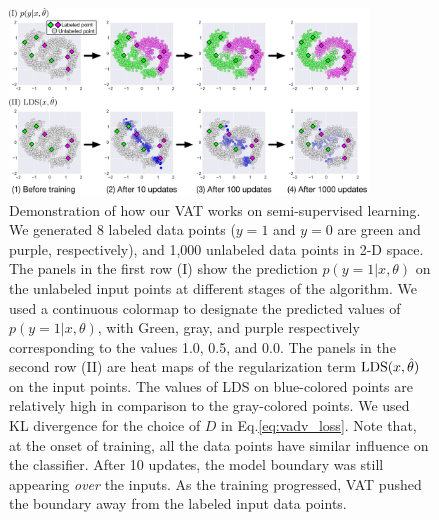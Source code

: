 \documentclass[10pt,journal,compsoc]{IEEEtran}
\begin{document}
\begin{figure}[ht]
	\centering
	\includegraphics[width=0.85\textwidth]{syn_semisup.png}
	\caption{\label{fig:syn_cont} Demonstration of how our VAT works on semi-supervised learning. We generated 8 labeled data points ($y=1$ and $y=0$ are green and purple, respectively), and 1,000 unlabeled data points in 2-D space. 
    The panels in the first row (I) show the prediction $p(y=1|x,\theta)$ on the unlabeled input points at different stages of the algorithm. We used a continuous colormap to designate the predicted values of $p(y=1|x,\theta)$, with Green, gray, and purple respectively corresponding to the values 1.0, 0.5, and 0.0.
    The panels in the second row (II) are heat maps of the regularization term ${\rm LDS}(x,\hat{\theta})$ on the input points. 
	The values of LDS on blue-colored points are relatively high in comparison to the gray-colored points. 
    We used KL divergence for the choice of $D$ in Eq.\eqref{eq:vadv_loss}.
    Note that, at the onset of training, all the data points have similar influence on the classifier.
    After 10 updates, the model boundary was still appearing \textit{over} the inputs.
    As the training progressed, VAT pushed the boundary away from the labeled input data points.
}
\end{figure}


\end{document}
